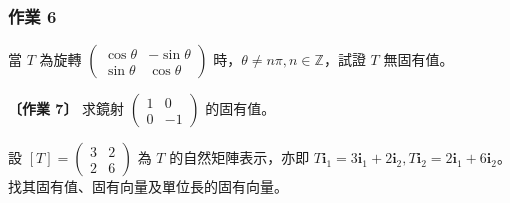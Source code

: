\subsubsection*{作業 6}
當 $T$ 為旋轉 $\begin{pmatrix} \cos\theta & -\sin\theta \\ \sin\theta & \cos\theta \end{pmatrix}$ 時，$\theta \ne n\pi, n \in \mathbb{Z}$，試證 $T$ 無固有值。

\textbf{〔作業 7〕} 求鏡射 $\begin{pmatrix} 1 & 0 \\ 0 & -1 \end{pmatrix}$ 的固有值。

\begin{discussion}
設 $[T] = \begin{pmatrix} 3 & 2 \\ 2 & 6 \end{pmatrix}$ 為 $T$ 的自然矩陣表示，亦即 $T\mathbf{i}_1 = 3\mathbf{i}_1 + 2\mathbf{i}_2, T\mathbf{i}_2 = 2\mathbf{i}_1 + 6\mathbf{i}_2$。找其固有值、固有向量及單位長的固有向量。
\end{discussion}

